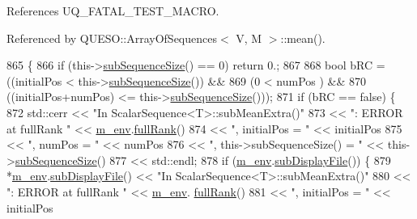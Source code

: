 References U\-Q\-\_\-\-F\-A\-T\-A\-L\-\_\-\-T\-E\-S\-T\-\_\-\-M\-A\-C\-R\-O.



Referenced by Q\-U\-E\-S\-O\-::\-Array\-Of\-Sequences$<$ V, M $>$\-::mean().


\begin{DoxyCode}
865 \{
866   \textcolor{keywordflow}{if} (this->\hyperlink{class_q_u_e_s_o_1_1_scalar_sequence_a0288ea295eedc216a1617b3286f6f3a0}{subSequenceSize}() == 0) \textcolor{keywordflow}{return} 0.;
867 
868   \textcolor{keywordtype}{bool} bRC = ((initialPos          <  this->\hyperlink{class_q_u_e_s_o_1_1_scalar_sequence_a0288ea295eedc216a1617b3286f6f3a0}{subSequenceSize}()) &&
869               (0                   <  numPos                 ) &&
870               ((initialPos+numPos) <= this->\hyperlink{class_q_u_e_s_o_1_1_scalar_sequence_a0288ea295eedc216a1617b3286f6f3a0}{subSequenceSize}()));
871   \textcolor{keywordflow}{if} (bRC == \textcolor{keyword}{false}) \{
872     std::cerr << \textcolor{stringliteral}{"In ScalarSequence<T>::subMeanExtra()"}
873               << \textcolor{stringliteral}{": ERROR at fullRank "}         << \hyperlink{class_q_u_e_s_o_1_1_scalar_sequence_a71618cd6351b29361b437af68447a4c8}{m\_env}.\hyperlink{class_q_u_e_s_o_1_1_base_environment_a84a239e42ae443cf71db6e03e8159620}{fullRank}()
874               << \textcolor{stringliteral}{", initialPos = "}              << initialPos
875               << \textcolor{stringliteral}{", numPos = "}                  << numPos
876               << \textcolor{stringliteral}{", this->subSequenceSize() = "} << this->\hyperlink{class_q_u_e_s_o_1_1_scalar_sequence_a0288ea295eedc216a1617b3286f6f3a0}{subSequenceSize}()
877               << std::endl;
878     \textcolor{keywordflow}{if} (\hyperlink{class_q_u_e_s_o_1_1_scalar_sequence_a71618cd6351b29361b437af68447a4c8}{m\_env}.\hyperlink{class_q_u_e_s_o_1_1_base_environment_a8a0064746ae8dddfece4229b9ad374d6}{subDisplayFile}()) \{
879       *\hyperlink{class_q_u_e_s_o_1_1_scalar_sequence_a71618cd6351b29361b437af68447a4c8}{m\_env}.\hyperlink{class_q_u_e_s_o_1_1_base_environment_a8a0064746ae8dddfece4229b9ad374d6}{subDisplayFile}() << \textcolor{stringliteral}{"In ScalarSequence<T>::subMeanExtra()"}
880                               << \textcolor{stringliteral}{": ERROR at fullRank "}         << \hyperlink{class_q_u_e_s_o_1_1_scalar_sequence_a71618cd6351b29361b437af68447a4c8}{m\_env}.
      \hyperlink{class_q_u_e_s_o_1_1_base_environment_a84a239e42ae443cf71db6e03e8159620}{fullRank}()
881                               << \textcolor{stringliteral}{", initialPos = "}              << initialPos

\end{DoxyCode}
